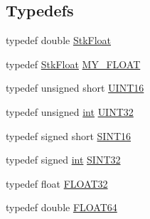 \subsection*{Typedefs}
\begin{DoxyCompactItemize}
\item 
typedef double \hyperlink{namespace_nyq_a044fa20a706520a617bbbf458a7db7e4}{Stk\+Float}
\item 
typedef \hyperlink{namespace_nyq_a044fa20a706520a617bbbf458a7db7e4}{Stk\+Float} \hyperlink{namespace_nyq_aae9a9f995a31fe0943328e4c69dac133}{M\+Y\+\_\+\+F\+L\+O\+AT}
\item 
typedef unsigned short \hyperlink{namespace_nyq_ace5c4d33af58cc46325c31da9cf930cd}{U\+I\+N\+T16}
\item 
typedef unsigned \hyperlink{xmltok_8h_a5a0d4a5641ce434f1d23533f2b2e6653}{int} \hyperlink{namespace_nyq_ab39e8701b04b7cff62d700999f9f5691}{U\+I\+N\+T32}
\item 
typedef signed short \hyperlink{namespace_nyq_acffddc601d91a00c01999ac7f22e08b5}{S\+I\+N\+T16}
\item 
typedef signed \hyperlink{xmltok_8h_a5a0d4a5641ce434f1d23533f2b2e6653}{int} \hyperlink{namespace_nyq_a9f9177b528d1412e9846059b0145de19}{S\+I\+N\+T32}
\item 
typedef float \hyperlink{namespace_nyq_a2e0284e7d509ea289c81a66a5bba2d74}{F\+L\+O\+A\+T32}
\item 
typedef double \hyperlink{namespace_nyq_aec688324c08f135b685ca1b5a5167d05}{F\+L\+O\+A\+T64}
\end{DoxyCompactItemize}
